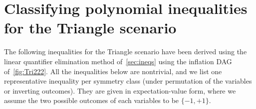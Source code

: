 \section{Classifying polynomial inequalities for the Triangle scenario}

The following inequalities for the Triangle scenario have been derived using the linear quantifier elimination method of~\cref{sec:ineqs} using the inflation DAG of~\cref{fig:Tri222}. All the inequalities below are nontrivial, 
and we list one representative inequality per symmetry class (under permutation of the variables or inverting outcomes). They are given in expectation-value form, where we assume the two possible outcomes of each variables to be $\{-1,+1\}$.


